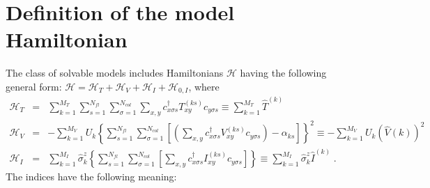 
\section{Definition of the model Hamiltonian}


 
The class of solvable models includes  Hamiltonians $\mathcal{H}$ having the following general form:
${\mathcal{H}=\mathcal{H}_{T}+\mathcal{H}_{V}} +  \mathcal{H}_{I} +   \mathcal{H}_{0,I}  $, where
\begin{eqnarray}
\label{eqn_general_ham2}
\mathcal{H}_{T}
&=&
\sum\limits_{k=1}^{M_T}
\sum\limits_{s=1}^{N_{fl}}
\sum\limits_{\sigma=1}^{N_{col}}
\sum\limits_{x,y}
c^{\dagger}_{x \sigma   s}T_{xy}^{(k s)} c^{\phantom\dagger}_{y \sigma s}  \equiv  \sum\limits_{k=1}^{M_T} \hat{T}^{(k)}\\
\mathcal{H}_{V}
&=&
-
\sum\limits_{k=1}^{M_V}U_{k}
\left\{
\sum\limits_{s=1}^{N_{fl}}
\sum\limits_{\sigma=1}^{N_{col}}
\left[
\left(
\sum\limits_{x,y}
c^{\dagger}_{x \sigma s}V_{xy}^{(k s)}c^{\phantom\dagger}_{y \sigma s}
\right)
-\alpha_{k s} 
\right]
\right\}^{2}  \equiv   -
\sum\limits_{k=1}^{M_V}U_{k}   \left(\hat{V}{(k)} \right)^2\\ 
\mathcal{H}_{I}  & = &
\sum\limits_{k=1}^{M_I} \hat{\sigma}^{z}_{k} 
\left\{
\sum\limits_{s=1}^{N_{fl}}
\sum\limits_{\sigma=1}^{N_{col}}
\left[
\sum\limits_{x,y}
c^{\dagger}_{x \sigma s} I_{xy}^{(k s)}c^{\phantom\dagger}_{y \sigma s}
\right]
\right\} \equiv \sum\limits_{k=1}^{M_I} \hat{\sigma}^{z}_{k}    \hat{I}^{(k)} 
\;.
\end{eqnarray}
The indices have the following meaning:
